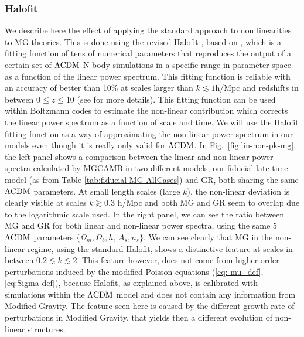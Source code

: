 \subsubsection{Halofit}
We describe here the effect of applying the standard 
approach to non linearities to MG theories. This is done using
the revised Halofit \cite{takahashi_revising_2012}, based on
\cite{smith_stable_2003},
which is a fitting function of tens of numerical parameters that reproduces
the output of a certain set of $\Lambda\mathrm{CDM}$ N-body simulations in a specific
range in parameter space as a function of the linear power spectrum.
This fitting function is reliable with an accuracy of better than
10\% at scales larger than $k\lesssim1$h/Mpc and redshifts in between
$0\leq z\leq10$ (see \cite{takahashi_revising_2012} for more details).
This fitting function can be used within Boltzmann codes to estimate
the non-linear contribution which corrects the linear power spectrum
as a function of scale and time. We will use the Halofit fitting function
 as a way of approximating the non-linear power spectrum in
our models even though it is really only valid for $\Lambda\mathrm{CDM}$. 
In Fig.\ \ref{fig:lin-non-pk-mg}, the left panel
shows a comparison between the linear and non-linear power spectra
calculated by MGCAMB in two different models, our fiducial late-time
model (as from Table \ref{tab:fiducial-MG-AllCases}) and GR, both sharing
the same $\Lambda\mathrm{CDM}$ parameters. At small length scales (large $k$),
the non-linear deviation is clearly visible at scales $k\gtrsim0.3$ h/Mpc
and both MG and GR seem to overlap due to the logarithmic scale used.
In the right panel, we can see the ratio between MG and GR for both linear
and non-linear power spectra, using the same 5 $\Lambda\mathrm{CDM}$ parameters
$\{\Omega_{m},\Omega_{b},h,\,A_{s},n_{s}\}$. We can see clearly that
MG in the non-linear regime, using the standard Halofit, shows a distinctive
feature at scales in between $0.2\lesssim k\lesssim2$. This feature
however, does not come from higher order perturbations induced by
the modified Poisson equations (\ref{eq: mu_def}, \ref{eq:Sigma-def}),
because Halofit, as explained above, is calibrated with simulations
within the $\Lambda\mathrm{CDM}$ model and does not contain any information from
Modified Gravity. The feature seen here is caused by the different
growth rate of perturbations in Modified Gravity, that yields then
a different evolution of non-linear structures. 

